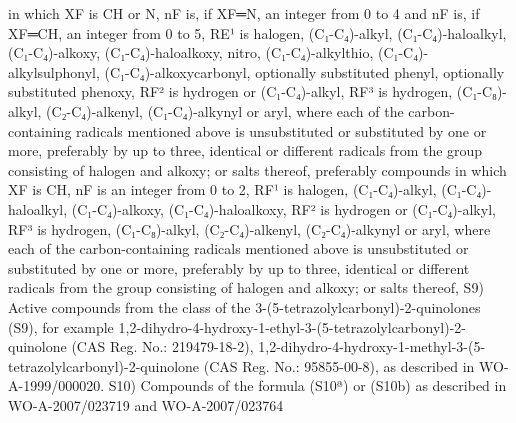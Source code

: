 \documentclass[11pt,a4paper]{article}
\begin{document}
in which XF is CH or N, nF is, if XF═N, an integer from 0 to 4 and nF is, if XF═CH, an integer from 0 to 5, RE¹ is halogen, (C₁-C₄)-alkyl, (C₁-C₄)-haloalkyl, (C₁-C₄)-alkoxy, (C₁-C₄)-haloalkoxy, nitro, (C₁-C₄)-alkylthio, (C₁-C₄)-alkylsulphonyl, (C₁-C₄)-alkoxycarbonyl, optionally substituted phenyl, optionally substituted phenoxy, RF² is hydrogen or (C₁-C₄)-alkyl, RF³ is hydrogen, (C₁-C₈)-alkyl, (C₂-C₄)-alkenyl, (C₁-C₄)-alkynyl or aryl, where each of the carbon-containing radicals mentioned above is unsubstituted or substituted by one or more, preferably by up to three, identical or different radicals from the group consisting of halogen and alkoxy; or salts thereof, preferably compounds in which XF is CH, nF is an integer from 0 to 2, RF¹ is halogen, (C₁-C₄)-alkyl, (C₁-C₄)-haloalkyl, (C₁-C₄)-alkoxy, (C₁-C₄)-haloalkoxy, RF² is hydrogen or (C₁-C₄)-alkyl, RF³ is hydrogen, (C₁-C₈)-alkyl, (C₂-C₄)-alkenyl, (C₂-C₄)-alkynyl or aryl, where each of the carbon-containing radicals mentioned above is unsubstituted or substituted by one or more, preferably by up to three, identical or different radicals from the group consisting of halogen and alkoxy; or salts thereof, S9) Active compounds from the class of the 3-(5-tetrazolylcarbonyl)-2-quinolones (S9), for example 1,2-dihydro-4-hydroxy-1-ethyl-3-(5-tetrazolylcarbonyl)-2-quinolone (CAS Reg. No.: 219479-18-2), 1,2-dihydro-4-hydroxy-1-methyl-3-(5-tetrazolylcarbonyl)-2-quinolone (CAS Reg. No.: 95855-00-8), as described in WO-A-1999/000020. S10) Compounds of the formula (S10ª) or (S10b) as described in WO-A-2007/023719 and WO-A-2007/023764
\end{document}
